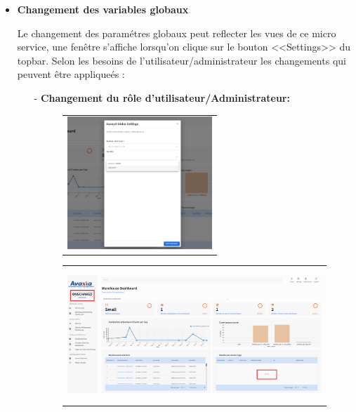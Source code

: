 \begin{itemize}
                 
            \item \textbf{Changement des variables globaux}
            \par Le changement des paramétres globaux peut reflecter les vues de ce micro service, une fenêtre s'affiche lorsqu'on clique sur le bouton <<Settings>> du topbar.
            Selon les besoins de l'utilisateur/administrateur les changements qui peuvent être appliqueés :
                \begin{enumerate}
                    \item[-] \textbf{Changement du rôle d'utilisateur/Administrateur:}
                    \begin{figure}[H]
                        \centering
                        \begin{tabular}[b]{c}
                        \includegraphics[width=.3\linewidth, height=5cm]{img/captures/warehouse/global_set_role.png} \\
                        
                        \end{tabular} 
                        \begin{tabular}[b]{c}
                        \includegraphics[width=.6\linewidth, height=5cm]{img/captures/warehouse/sysorg.png} \\
                        

\end{tabular}
\end{figure}
\end{enumerate}
\end{itemize}
